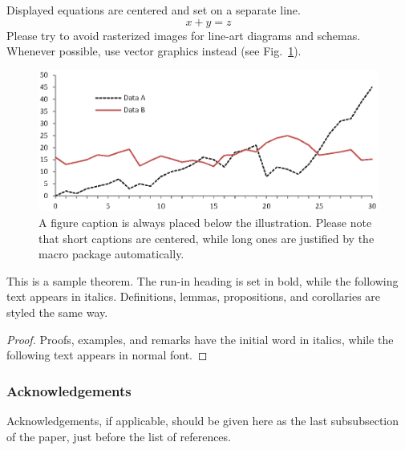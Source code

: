 \documentclass[runningheads]{llncs}
\begin{document}
	\noindent Displayed equations are centered and set on a separate
	line.
	\begin{equation}
	x + y = z
	\end{equation}
	Please try to avoid rasterized images for line-art diagrams and
	schemas. Whenever possible, use vector graphics instead (see
	Fig.~\ref{fig1}).
	
	\begin{figure}[h]
		\includegraphics[width=\textwidth]{fig1.eps}
		\caption{A figure caption is always placed below the illustration.
			Please note that short captions are centered, while long ones are
			justified by the macro package automatically.} \label{fig1}
	\end{figure}
	
	\begin{theorem}
		This is a sample theorem. The run-in heading is set in bold, while
		the following text appears in italics. Definitions, lemmas,
		propositions, and corollaries are styled the same way.
	\end{theorem}
	\begin{proof}
		Proofs, examples, and remarks have the initial word in italics,
		while the following text appears in normal font.
	\end{proof}
	
	\subsubsection*{Acknowledgements}
	Acknowledgements, if applicable, should be given here as the last 
	subsubsection of the paper, just before the list of references.
	
	
	
\end{document}
